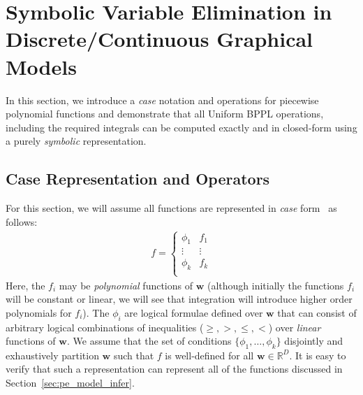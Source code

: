 \documentclass[letterpaper]{article}
\newcommand{\R}{\mathbb{R}}
\renewcommand{\vec}[1]{\mathbf{#1}}
\begin{document}
\section{Symbolic Variable Elimination in Discrete/Continuous Graphical Models}

In this section, we introduce a \emph{case} notation and operations
for piecewise polynomial functions and demonstrate that all Uniform
BPPL operations, including the required integrals can be computed
exactly and in closed-form using a purely \emph{symbolic}
representation.

\subsection{Case Representation and Operators}

For this section, we will assume all functions
are represented in \emph{case} form~\cite{uai11} as follows:
{%
\begin{align}
f = 
\begin{cases}
  \phi_1 & f_1 \\ 
  \vdots & \vdots \\ 
  \phi_k & f_k \\ 
\end{cases} \label{eq:case}
\end{align}
} Here, the $f_i$ may be \emph{polynomial} functions of $\vec{w}$ (although
initially the functions $f_i$ will be constant or linear, we will see
that integration will introduce higher order polynomials for $f_i$).  The
$\phi_i$ are logical formulae defined over $\vec{w}$ that can consist
of arbitrary logical combinations of inequalities ($\geq,>,\leq,<$)
over \emph{linear} functions of $\vec{w}$.  We assume that the set of
conditions $\{ \phi_1,\ldots,\phi_k \}$ disjointly and exhaustively
partition $\vec{w}$ such that $f$ is well-defined for all $\vec{w} \in
\R^D$.  It is easy to verify that such a representation can represent
all of the functions discussed in Section~\ref{sec:pe_model_infer}.
\end{document}
